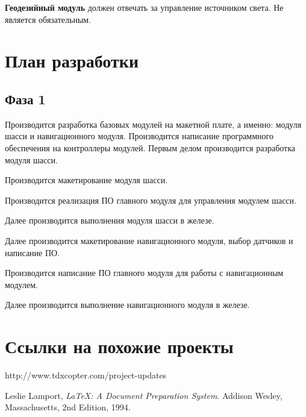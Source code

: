 \documentclass[utf8]{report}
\begin{document}
\textbf{Геодезийный модуль} должен отвечать за управление источником света. Не является обязательным.

\chapter{План разработки}

\section{Фаза 1}

Производится разработка базовых модулей на макетной плате, а именно: модуля шасси и навигационного модуля. Производится написание программного обеспечения на контроллеры модулей. Первым делом производится разработка модуля шасси.

Производится макетирование модуля шасси.

Производится реализация ПО главного модуля для управления модулем шасси.

Далее производится выполнения модуля шасси в железе.

Далее производится макетирование навигационного модуля, выбор датчиков и написание ПО.

Производится написание ПО главного модуля для работы с навигационным модулем.

Далее производится выполнение навигационного модуля в железе.


\chapter{Ссылки на похожие проекты}

http://www.tdxcopter.com/project-updates

\begin{thebibliography}{9}
      Leslie Lamport,
      \emph{\LaTeX: A Document Preparation System}.
      Addison Wesley, Massachusetts,
      2nd Edition,
      1994.
 
\end{thebibliography}
 
\end{document}

